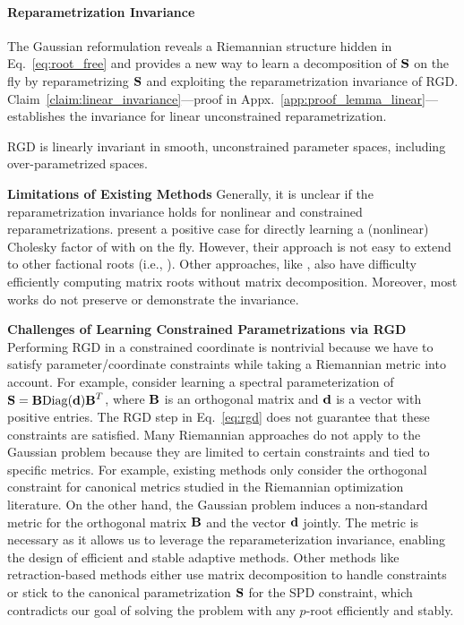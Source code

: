 \vspace{-0.35cm}
\paragraph{Reparametrization Invariance} 
The Gaussian reformulation reveals a Riemannian structure hidden in  Eq.~\eqref{eq:root_free} and provides a new way to learn a decomposition of $\mbox{$\mbox{$\mathbf{S}$}$}$ on the fly by 
reparametrizing $\mbox{$\mbox{$\mathbf{S}$}$}$ and exploiting the reparametrization invariance of RGD.
Claim~\ref{claim:linear_invariance}—proof in Appx.~\ref{app:proof_lemma_linear}—establishes the invariance for linear unconstrained reparametrization.

\begin{claim}
\label{claim:linear_invariance}
RGD is linearly invariant in smooth, unconstrained parameter spaces, including over-parametrized spaces. 
\end{claim}

\vspace{-0.2cm}

{\bf Limitations of Existing Methods}
Generally, it is unclear if 
the reparametrization invariance holds for nonlinear and constrained reparametrizations.
\citet{lincan2024} present a positive case for directly learning a (nonlinear) Cholesky factor of  with \scalebox{0.8}{$p=1$} on the fly.
However, their approach is not easy to extend to other factional 
roots (i.e., \scalebox{0.8}{$p\neq 1$}). 
Other approaches, like \citet{khan18a,
lin2020handling,
lin2021tractable,
tran2021variational,tan2021analytic,godichon2024natural}, also have difficulty efficiently computing matrix roots without matrix decomposition.
%
Moreover, most works do not preserve or demonstrate the invariance.
%

{\bf Challenges of Learning Constrained  Parametrizations via RGD}\, 
Performing RGD in a constrained coordinate is nontrivial because we have to satisfy parameter/coordinate constraints while taking a Riemannian metric into account.
For example, consider learning a spectral parameterization of $\mbox{$\mbox{$\mathbf{S}$}$}=\mbox{$\mbox{$\mathbf{B}$}$} \mathrm{Diag}(\mbox{$\mbox{$\mathbf{d}$}$})\mbox{$\mbox{$\mathbf{B}$}$}^T$, where $\mbox{$\mbox{$\mathbf{B}$}$}$ is an orthogonal matrix and $\mbox{$\mbox{$\mathbf{d}$}$}$ is a vector with positive entries.
The RGD step in Eq.~\eqref{eq:rgd} does not
guarantee that these constraints are satisfied.
%
%
%
Many Riemannian approaches do not apply to the Gaussian problem because they are limited to certain constraints and tied to specific metrics.
For example, existing methods \citep{li2020efficient,kong2022momentum} only consider the orthogonal constraint for canonical metrics \citep{tagare2011notes} studied in the Riemannian optimization literature.
%
On the other hand, the Gaussian problem induces a non-standard metric for the orthogonal matrix $\mbox{$\mbox{$\mathbf{B}$}$}$ and the vector $\mbox{$\mbox{$\mathbf{d}$}$}$ jointly. 
The metric is necessary as it allows us to leverage the reparameterization invariance, enabling the design of efficient and stable adaptive methods.
Other methods like retraction-based methods \citep{boumal2014manopt} either use matrix decomposition to handle constraints or stick to the canonical parametrization $\mbox{$\mbox{$\mathbf{S}$}$}$ for the SPD constraint, which contradicts our goal of solving the  problem with any $p$-root efficiently and stably.
%


